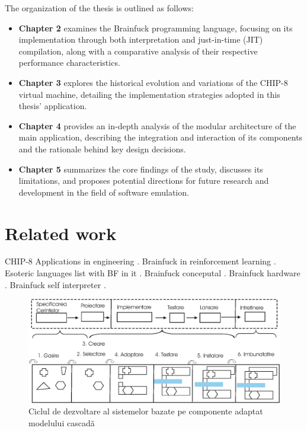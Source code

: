 \clearpage

\par The organization of the thesis is outlined as follows:

\begin{itemize}
    \item \textbf{Chapter 2} examines the Brainfuck programming language, focusing on its implementation through both interpretation and just-in-time (JIT) compilation, along with a comparative analysis of their respective performance characteristics.
    \item \textbf{Chapter 3} explores the historical evolution and variations of the CHIP-8 virtual machine, detailing the implementation strategies adopted in this thesis' application.
    \item \textbf{Chapter 4} provides an in-depth analysis of the modular architecture of the main application, describing the integration and interaction of its components and the rationale behind key design decisions.
    \item \textbf{Chapter 5} summarizes the core findings of the study, discusses its limitations, and proposes potential directions for future research and development in the field of software emulation.
\end{itemize}

\section{Related work}
\label{chap:ch1sec2}

\par CHIP-8 Applications in engineering \cite{Chip8Applications2019}.
Brainfuck in reinforcement learning \cite{BFReinforcementLearining2022}.
Esoteric languages list with BF in it \cite{BFEsolang2015}.
Brainfuck conceputal \cite{BFConceptual2017}.
Brainfuck hardware \cite{BFHardware2016}.
Brainfuck self interpreter \cite{BFSelfInterpreter2003}.

\begin{figure}[htbp]
	\centering
		\includegraphics[scale=0.65]{./figures/fig_3_1.eps}
	\caption{Ciclul de dezvoltare al sistemelor bazate pe componente adaptat modelului cascadã}
	\label{FigCBSD}
\end{figure}

